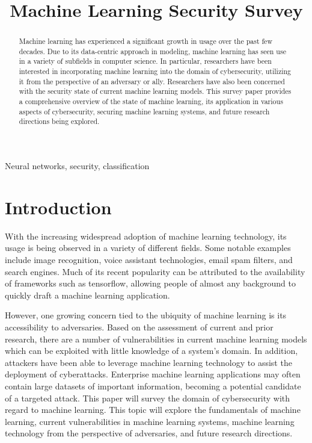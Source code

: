 \documentclass[11pt,conference]{IEEEtran}
\begin{document}
\title{Machine Learning Security Survey \\
}

\author{
}

\maketitle

\begin{abstract}
Machine learning has experienced a significant growth in usage 
over the past few decades. Due to its data-centric approach in modeling, 
machine learning has seen use in a variety of subfields in computer science. In
particular, researchers have been interested in incorporating machine learning
into the domain of cybersecurity, utilizing it from the perspective of an
adversary or ally. Researchers have also been concerned with the security state
of current machine learning models. This survey paper provides a comprehensive overview of
the state of machine learning, its application in various aspects of
cybersecurity, securing machine learning systems, and future research directions being explored.
\end{abstract}

\begin{IEEEkeywords}
Neural networks, security, classification
\end{IEEEkeywords}

\section{Introduction}
With the increasing widespread adoption of machine learning technology, its
usage is being observed in a variety of different fields. Some notable examples
include image recognition, voice assistant technologies, email spam filters, and search
engines. Much of its recent popularity can be attributed to the availability of
frameworks such as tensorflow, allowing people of almost any background to
quickly draft a machine learning application.
\newline

However, one growing concern tied to the ubiquity of machine learning is its 
accessibility to adversaries. Based on the assessment of current and prior
research, there are a number of vulnerabilities in current machine learning
models which can be exploited with little knowledge of a system's domain. In
addition, attackers have been able to leverage machine learning technology to
assist the deployment of cyberattacks. Enterprise machine learning applications
may often contain large datasets of important information, becoming a potential 
candidate of a targeted attack. This paper will survey the domain of
cybersecurity with regard to machine learning. This topic will explore the
fundamentals of machine learning, current vulnerabilities in machine learning
systems, machine learning technology from the perspective of adversaries, and
future research directions.
\end{document}
